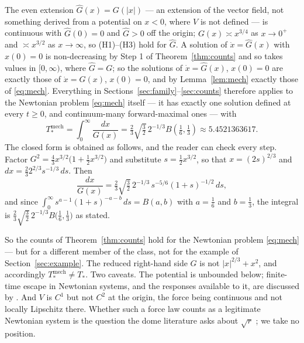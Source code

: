 \documentclass[12pt]{article}
\theoremstyle{plain}
\theoremstyle{definition}
\theoremstyle{remark}
\begin{document}
The even extension $\hat G(x)=G(|x|)$ --- an extension of the vector field, not
something derived from a potential on $x<0$, where $V$ is not defined --- is
continuous with $\hat G(0)=0$ and $\hat G>0$ off the origin;
$G(x)\asymp x^{3/4}$ as $x\to0^{+}$ and $\asymp x^{3/2}$ as $x\to\infty$, so
(H1)--(H3) hold for $\hat G$. A solution of $\dot x=\hat G(x)$ with $x(0)=0$ is
non-decreasing by Step 1 of Theorem~\ref{thm:counts} and so takes values in
$[0,\infty)$, where $\hat G=G$; so the solutions of $\dot x=\hat G(x)$,
$x(0)=0$ are exactly those of $\dot x=G(x)$, $x(0)=0$, and by
Lemma~\ref{lem:mech} exactly those of \eqref{eq:mech}. Everything in
Sections~\ref{sec:family}--\ref{sec:counts} therefore applies to the Newtonian
problem \eqref{eq:mech} itself --- it has exactly one solution defined at every
$t\ge0$, and continuum-many forward-maximal ones --- with
\[
  T_{*}^{\mathrm{mech}}=\int_{0}^{\infty}\frac{dx}{G(x)}
  =\tfrac23\sqrt{\tfrac32}\,2^{-1/3}B\!\left(\tfrac16,\tfrac13\right)
  \approx 5.4521363617 .
\]
The closed form is obtained as follows, and the reader can check every step.
Factor $G^{2}=\tfrac43 x^{3/2}\big(1+\tfrac12 x^{3/2}\big)$ and substitute
$s=\tfrac12 x^{3/2}$, so that $x=(2s)^{2/3}$ and
$dx=\tfrac23 2^{2/3}s^{-1/3}\,ds$. Then
\[
  \frac{dx}{G(x)}
  =\tfrac23\sqrt{\tfrac32}\,2^{-1/3}\,s^{-5/6}(1+s)^{-1/2}\,ds ,
\]
and since $\int_{0}^{\infty}s^{a-1}(1+s)^{-a-b}\,ds=B(a,b)$ with $a=\tfrac16$
and $b=\tfrac13$, the integral is $\tfrac23\sqrt{\tfrac32}\,2^{-1/3}
B\big(\tfrac16,\tfrac13\big)$ as stated.

So the counts of Theorem~\ref{thm:counts} hold for the Newtonian problem
\eqref{eq:mech} --- but for a different member of the class, not for the example
of Section~\ref{sec:example}. The reduced right-hand side $G$ is not
$|x|^{2/3}+x^{2}$, and accordingly $T_{*}^{\mathrm{mech}}\ne T_{*}$. Two
caveats. The potential is unbounded below; finite-time escape in Newtonian
systems, and the responses available to it, are discussed by \citet{Earman}.
And $V$ is $C^{1}$ but not $C^{2}$ at the origin, the force being continuous and
not locally Lipschitz there. Whether such a force law counts as a legitimate Newtonian system is the
question the dome literature asks about $\sqrt r$ \citep{Fletcher,Norton}; we
take no position.
\end{document}
